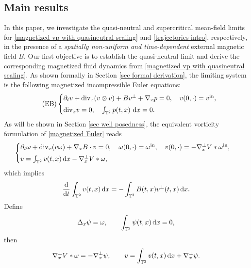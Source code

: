 \documentclass[11pt,reqno]{amsart}
\numberwithin{equation}{section}
\def\dd{{\rm d}}
\begin{document}
\subsection{Main results}
In this paper, we investigate the quasi-neutral and supercritical mean-field limits 
for \eqref{magnetized vp with quasineutral scaling} and \eqref{trajectories intro}, respectively, 
in the presence of a \textit{spatially non-uniform and time-dependent} external magnetic field
$B$. 
Our first objective is to establish the quasi-neutral limit and derive the corresponding magnetized 
fluid dynamics from \eqref{magnetized vp with quasineutral scaling}. 
As shown formally in Section \ref{sec formal derivation}, 
the limiting system is the following magnetized incompressible Euler equations:
\begin{align}\tag{EB}
\begin{cases}
\partial_{t}v+\mathrm{div}_{x}(v\otimes v)+Bv^{\perp}+\nabla_{x} p=0, \quad 
v(0,\cdot)=v^{\mathrm{in}},\\[1mm]
\mathrm{div}_{x}v=0,\quad  \int_{\mathbb{T}^{2}}p(t,x)\ \dd x=0. 
\end{cases}    
\label{magnetized Euler}  
\end{align}
As will be shown in Section \ref{sec well posedness}, 
the equivalent vorticity formulation of \eqref{magnetized Euler} reads 
\begin{align}
\begin{cases}
\partial_{t}\omega+\mathrm{div}_{x}(v\omega)
+\nabla_{x}B\cdot v=0,
\quad \omega(0,\cdot)=\omega^{\mathrm{in}},
\quad v(0,\cdot)=-\nabla_{x}^{\perp}V\ast\omega^{\mathrm{in}},\\[1mm]
v
=\int_{\mathbb{T}^{2}}v(t,x)\,\dd x
-\nabla_x^\perp V\ast\omega,
\end{cases}
\label{vorticity formulation intro}
\end{align}
which implies
\begin{equation}\label{1.4a}
\displaystyle
\frac{\dd}{\dd t}\int_{\mathbb{T}^{2}}v(t,x)\,\dd x
=
-\int_{\mathbb{T}^{2}}B(t,x)v^{\perp}(t,x)\,\dd x.
\end{equation}
Define 
\begin{equation}\label{1.5a}
\Delta_{x}\psi=\omega,\qquad
\int_{\mathbb{T}^{2}}\psi(t,x)\,\dd x=0,
\end{equation}
then
\begin{equation}\label{1.6a}
\nabla_x^\perp V\ast\omega=-\nabla_{x}^{\perp}\psi,
\qquad
v
=\int_{\mathbb{T}^{2}}v(t,x)\,\dd x+\nabla_{x}^{\perp}\psi.
\end{equation}
\end{document}

